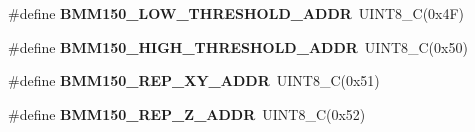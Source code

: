 \begin{DoxyCompactItemize}
\mbox{\label{group___b_m_m150_gac62a25e704f97becd8244199611ff717}} 
\#define {\bfseries B\+M\+M150\+\_\+\+L\+O\+W\+\_\+\+T\+H\+R\+E\+S\+H\+O\+L\+D\+\_\+\+A\+D\+DR}~U\+I\+N\+T8\+\_\+C(0x4\+F)
\item 
\mbox{\label{group___b_m_m150_gabd2e2ad720f86ad0d9e6ece900b6628d}} 
\#define {\bfseries B\+M\+M150\+\_\+\+H\+I\+G\+H\+\_\+\+T\+H\+R\+E\+S\+H\+O\+L\+D\+\_\+\+A\+D\+DR}~U\+I\+N\+T8\+\_\+C(0x50)
\item 
\mbox{\label{group___b_m_m150_ga9c6f8a06b24b62550a7f2015607b6f52}} 
\#define {\bfseries B\+M\+M150\+\_\+\+R\+E\+P\+\_\+\+X\+Y\+\_\+\+A\+D\+DR}~U\+I\+N\+T8\+\_\+C(0x51)
\item 
\mbox{\label{group___b_m_m150_ga6ce4d850289faf75a778b68bd1a3c33e}} 
\#define {\bfseries B\+M\+M150\+\_\+\+R\+E\+P\+\_\+\+Z\+\_\+\+A\+D\+DR}~U\+I\+N\+T8\+\_\+C(0x52)
\end{DoxyCompactItemize}
